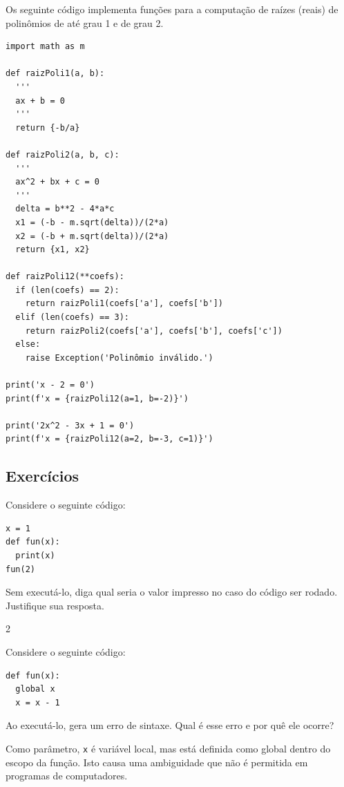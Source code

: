 \begin{ex}
  Os seguinte código implementa funções para a computação de raízes (reais) de polinômios de até grau 1 e de grau 2.

\begin{lstlisting}
import math as m

def raizPoli1(a, b):
  '''
  ax + b = 0
  '''
  return {-b/a}

def raizPoli2(a, b, c):
  '''
  ax^2 + bx + c = 0
  '''
  delta = b**2 - 4*a*c
  x1 = (-b - m.sqrt(delta))/(2*a)
  x2 = (-b + m.sqrt(delta))/(2*a)
  return {x1, x2}

def raizPoli12(**coefs):
  if (len(coefs) == 2):
    return raizPoli1(coefs['a'], coefs['b'])
  elif (len(coefs) == 3):
    return raizPoli2(coefs['a'], coefs['b'], coefs['c'])
  else:
    raise Exception('Polinômio inválido.')

print('x - 2 = 0')
print(f'x = {raizPoli12(a=1, b=-2)}')

print('2x^2 - 3x + 1 = 0')
print(f'x = {raizPoli12(a=2, b=-3, c=1)}')
\end{lstlisting}

\end{ex}

\subsection{Exercícios}

\begin{exer}
  Considere o seguinte código:

\begin{lstlisting}
x = 1
def fun(x):
  print(x)
fun(2)
\end{lstlisting}
  
Sem executá-lo, diga qual seria o valor impresso no caso do código ser rodado. Justifique sua resposta.
\end{exer}
\begin{resp}
  2
\end{resp}

\begin{exer}
  Considere o seguinte código:

\begin{lstlisting}
def fun(x):
  global x
  x = x - 1
\end{lstlisting}
  
Ao executá-lo, {\python} gera um erro de sintaxe. Qual é esse erro e por quê ele ocorre?
\end{exer}
\begin{resp}
  Como parâmetro, \lstinline+x+ é variável local, mas está definida como global dentro do escopo da função. Isto causa uma ambiguidade que não é permitida em programas de computadores.
\end{resp}

